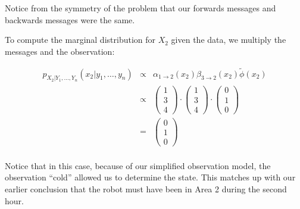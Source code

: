 \documentclass[6008notes.tex]{subfiles}
\begin{document}
Notice from the symmetry of the problem that our forwards messages and backwards messages were the same.

To compute the marginal distribution for $X_2$ given the data, we multiply the messages and the observation:

\begin{eqnarray*}
		p_{X_2 | Y_1, \ldots, Y_n}(x_2|y_1,\ldots,y_n) &\propto &
				\alpha_{1 \to 2}(x_2)
				\beta_{3 \to 2}(x_2)
				\tilde{\phi}(x_2) \\
		&\propto &
				\begin{pmatrix} 1 \\ 3 \\ 4 \end{pmatrix} \cdot
				\begin{pmatrix} 1 \\ 3 \\ 4 \end{pmatrix} \cdot
				\begin{pmatrix} 0 \\ 1 \\ 0 \end{pmatrix} \\
		&=& \begin{pmatrix} 0 \\ 1 \\ 0 \end{pmatrix} \\
\end{eqnarray*}

Notice that in this case, because of our simplified observation model, the observation ``cold'' allowed us to determine the state. This matches up with our earlier conclusion that the robot must have been in Area 2 during the second hour.
\end{document}
